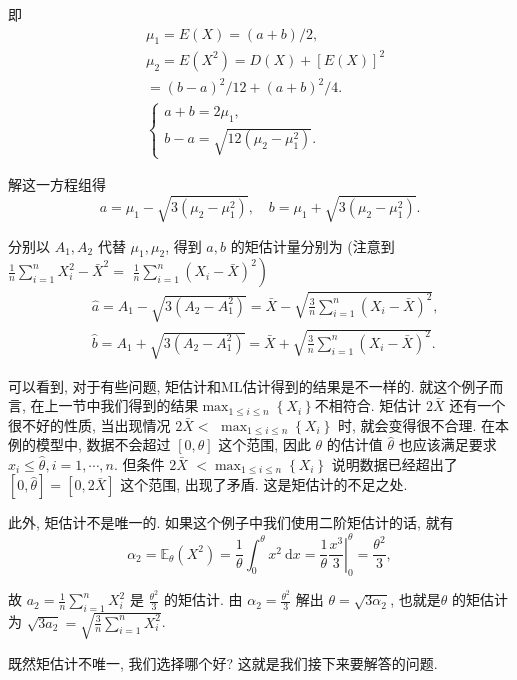 \begin{solution}
    即
    $$
    \begin{aligned}
    & \mu_1=E(X)=(a+b) / 2, \\
    & \mu_2=E\left(X^2\right)=D(X)+[E(X)]^2 \\
    &=(b-a)^2 / 12+(a+b)^2 / 4 . \\
    &\left\{\begin{array}{l}
    a+b=2 \mu_1, \\
    b-a=\sqrt{12\left(\mu_2-\mu_1^2\right)} .
    \end{array}\right.
    \end{aligned}
    $$
    
    解这一方程组得
    $$
    a=\mu_1-\sqrt{3\left(\mu_2-\mu_1^2\right)}, \quad b=\mu_1+\sqrt{3\left(\mu_2-\mu_1^2\right)} .
    $$

    分别以 $A_1, A_2$ 代替 $\mu_1, \mu_2$, 得到 $a, b$ 的矩估计量分别为 (注意到 $\frac{1}{n} \sum_{i=1}^n X_i^2-\bar{X}^2=$ $\left.\frac{1}{n} \sum_{i=1}^n\left(X_i-\bar{X}\right)^2\right)$
$$
\begin{aligned}
& \hat{a}=A_1-\sqrt{3\left(A_2-A_1^2\right)}=\bar{X}-\sqrt{\frac{3}{n} \sum_{i=1}^n\left(X_i-\bar{X}\right)^2}, \\
& \hat{b}=A_1+\sqrt{3\left(A_2-A_1^2\right)}=\bar{X}+\sqrt{\frac{3}{n} \sum_{i=1}^n\left(X_i-\bar{X}\right)^2} .
\end{aligned}
$$
\end{solution}

可以看到, 对于有些问题, 矩估计和ML估计得到的结果是不一样的. 就这个例子而言, 在上一节中我们得到的结果$\max _{1 \leq i \leq n}\left\{X_i\right\}$不相符合. 矩估计 $2 \bar{X}$ 还有一个很不好的性质, 当出现情况 $2 \bar{X}<$ $\max _{1 \leq i \leq n}\left\{X_i\right\}$ 时, 就会变得很不合理. 在本例的模型中, 数据不会超过 $[0, \theta]$ 这个范围, 因此 $\theta$ 的估计值 $\hat{\theta}$ 也应该满足要求 $x_i \leq \hat{\theta}, i=1, \cdots, n$. 但条件 $2 \bar{X}$ $<\max _{1 \leq i \leq n}\left\{X_i\right\}$ 说明数据已经超出了 $[0, \hat{\theta}]=[0,2 \bar{X}]$ 这个范围, 出现了矛盾. 这是矩估计的不足之处.

此外, 矩估计不是唯一的. 如果这个例子中我们使用二阶矩估计的话, 就有
$$
\alpha_2=\mathbb{E}_\theta\left(X^2\right)=\frac{1}{\theta} \int_0^\theta x^2 \mathrm{~d} x=\left.\frac{1}{\theta} \frac{x^3}{3}\right|_0 ^\theta=\frac{\theta^2}{3},
$$

故 $a_2=\frac{1}{n} \sum_{i=1}^n X_i^2$ 是 $\frac{\theta^2}{3}$ 的矩估计. 由 $\alpha_2=\frac{\theta^2}{3}$ 解出 $\theta=\sqrt{3 \alpha_2}$, 也就是$\theta$ 的矩估计为 $\sqrt{3 a_2}=\sqrt{\frac{3}{n} \sum_{i=1}^n X_i^2}$.

既然矩估计不唯一, 我们选择哪个好? 这就是我们接下来要解答的问题.  